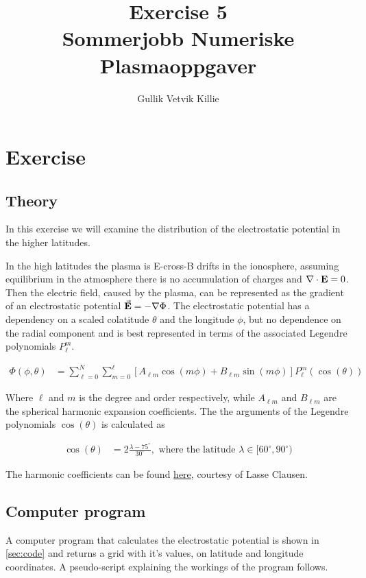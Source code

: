 \documentclass[x11names]{article}
\title{ Exercise 5 \\ Sommerjobb Numeriske Plasmaoppgaver }
\author{Gullik Vetvik Killie
		}
\begin{document}
\maketitle

\section{Exercise}

\subsection{Theory}
  In this exercise we will examine the distribution of the electrostatic potential in the higher latitudes.

  In the high latitudes the plasma is E-cross-B drifts in the ionosphere, assuming equilibrium in the atmosphere there is no accumulation of charges and \(\nabla\cdot\vb{E} = 0\). Then the electric field, caused by the plasma, can be represented as the gradient of an electrostatic potential \(\va{E} = - \nabla\Phi\). The electrostatic potential has a dependency on a scaled colatitude \(\theta\) and the longitude \(\phi\), but no dependence on the radial component and is best represented in terms of the associated Legendre polynomials \(P^m_\ell\).

  \begin{align}
    \Phi(\phi ,\theta) &= \sum^N_{\ell = 0}\sum^\ell_{m= 0} \left[ A_{\ell m}\cos(m \phi) + B_{\ell m}\sin(m \phi) \right] P^m_\ell(\cos(\theta))   \label{eq:phi_sum}
  \end{align}

  Where \(\ell\) and \(m\) is the degree and order respectively, while \(A_{\ell m}\) and \(B_{\ell m}\) are the spherical harmonic expansion coefficients. The the arguments of the Legendre polynomials \(\cos(\theta)\) is calculated as

  \begin{align}
    \cos(\theta) &= 2\frac{\lambda - 75^\circ}{30^\circ}, \text{  where the latitude }  \lambda \in [ 60^\circ, 90^\circ )
  \end{align}

  The harmonic coefficients can be found \href{http://folk.uio.no/lbnc/fys3610/heppner_coeffs.txt}{here}, courtesy of Lasse Clausen.


  \subsection{Computer program}
      A computer program that calculates the electrostatic potential is shown in \cref{sec:code} and returns a grid with it's values, on latitude and longitude coordinates. A pseudo-script explaining the workings of the program follows.
\end{document}
